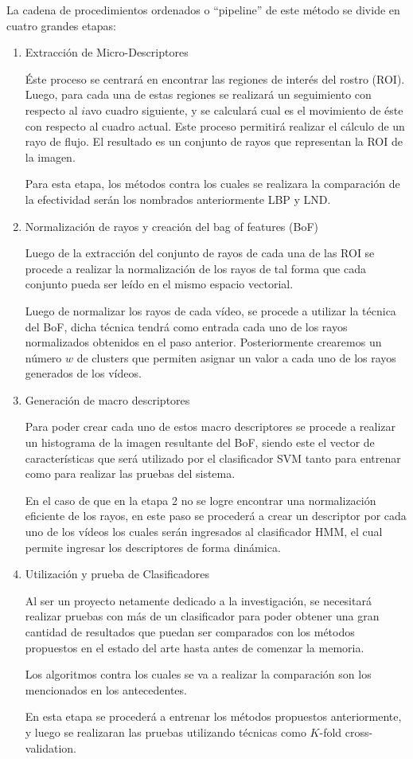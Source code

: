 \documentclass{article}
\begin{document}
La cadena de procedimientos ordenados o “pipeline” de este método se divide en cuatro grandes etapas:
    \begin{enumerate}
    \item Extracción de Micro-Descriptores
    
    Éste proceso se centrará en encontrar las regiones de interés del rostro (ROI). Luego, para cada una de estas regiones se realizará un seguimiento con respecto al $i$avo cuadro siguiente, y se calculará cual es el movimiento de éste con respecto al cuadro actual. Este proceso permitirá realizar el cálculo de un rayo de flujo. El resultado es un conjunto de rayos que representan la ROI de la imagen.
    
    Para esta etapa, los métodos contra los cuales se realizara la comparación de la efectividad serán los nombrados anteriormente LBP y LND.
    
    \item Normalización de rayos y creación del bag of features (BoF)
    
Luego de la extracción del conjunto de rayos de cada una de las ROI se procede a realizar la normalización de los rayos de tal forma que cada conjunto pueda ser leído en el mismo espacio vectorial.

Luego de normalizar los rayos de cada vídeo, se procede a utilizar la técnica del BoF, dicha técnica tendrá como entrada cada uno de los rayos normalizados obtenidos en el paso anterior. Posteriormente crearemos un número $w$ de clusters que permiten asignar un valor a cada uno de los rayos generados de los vídeos. 

    \item Generación de macro descriptores
    
Para poder crear cada uno de estos macro descriptores se procede a realizar un histograma de la imagen resultante del BoF, siendo este el vector de características que será utilizado por el clasificador SVM tanto para entrenar como para realizar las pruebas del sistema.

En el caso de que en la etapa 2 no se logre encontrar una normalización eficiente de los rayos, en este paso se procederá a crear un descriptor por cada uno de los vídeos los cuales serán ingresados al clasificador HMM, el cual permite ingresar los descriptores de forma dinámica.
	
    \item Utilización y prueba de Clasificadores
    
Al ser un proyecto netamente dedicado a la investigación, se necesitará realizar pruebas con más de un clasificador para poder obtener una gran cantidad de resultados que puedan ser comparados con los métodos propuestos en el estado del arte hasta antes de comenzar la memoria. 

Los algoritmos contra los cuales se va a realizar la comparación son los mencionados en los antecedentes.

En esta etapa se procederá a entrenar los métodos propuestos anteriormente, y luego se realizaran las pruebas utilizando técnicas como $K$-fold cross-validation.
    \end{enumerate}
    
\end{document}
